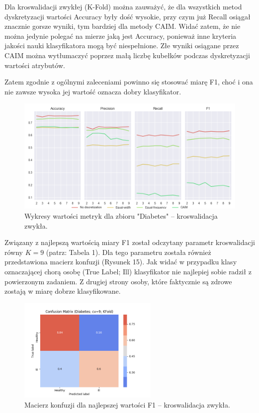 Dla kroswalidacji zwykłej (K-Fold) można zauważyć, że dla wszystkich metod dyskretyzacji
wartości Accuracy były dość wysokie, przy czym już Recall osiągał znacznie gorsze
wyniki, tym bardziej dla metody CAIM. Widać zatem, że nie można jedynie polegać na
mierze jaką jest Accuracy, ponieważ inne kryteria jakości nauki klasyfikatora mogą być
niespełnione. Złe wyniki osiągane przez CAIM można wytłumaczyć poprzez małą liczbę kubełków
podczas dyskretyzacji wartości atrybutów.

Zatem zgodnie z ogólnymi zaleceniami powinno się stosować miarę F1, choć i ona
nie zawsze wysoka jej wartość oznacza dobry klasyfikator.

\begin{figure}[H]
    \center
    \includegraphics[width=\textwidth]{img/cv_scores_kfold/scoring_kfold_diabetes.png}
    \caption{Wykresy wartości metryk dla zbioru "Diabetes" -- kroswalidacja zwykła.}
\end{figure}

Związany z najlepszą wartością miary F1 został odczytany parametr kroswalidacji
równy $K = 9$ (patrz: Tabela 1). Dla tego parametru została również przedstawiona
macierz konfuzji (Rysunek 15). Jak widać w przypadku klasy oznaczającej chorą osobę
(True Label; Ill) klasyfikator nie najlepiej sobie radził z powierzonym zadaniem.
Z drugiej strony osoby, które faktycznie są zdrowe zostają w miarę dobrze klasyfikowane.

\begin{figure}[H]
    \center
    \includegraphics[width=0.6\textwidth]{img/conf_matrices/cm_Diabetes_cv9_KFold.png}
    \caption{Macierz konfuzji dla najlepszej wartości F1 -- kroswalidacja zwykła.}
\end{figure}

